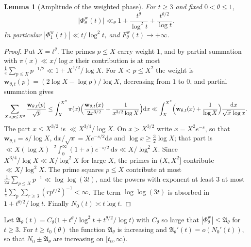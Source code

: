 \documentclass[11pt,a4paper]{article}
\numberwithin{equation}{section}
\newtheorem{lemma}[theorem]{Lemma}
\theoremstyle{definition}
\theoremstyle{remark}
\begin{document}
\begin{lemma}[Amplitude of the weighted phase]\label{lem:taucw-amp}
For $t\ge3$ and fixed $0<\theta\le1$,
\begin{equation}\label{eq:taucw-amp}
\bigl|\Phi^{\mathrm w}_\theta(t)\bigr|\ll_\theta1+\frac{t^\theta}{\log^2t}+\frac{t^{\theta/2}}{\log t}.
\end{equation}
In particular $|\Phi^{\mathrm w}_1(t)|\ll t/\log^2t$, and $F^{\mathrm w}_\theta(t)\to+\infty$.
\end{lemma}
\begin{proof}
Put $X=t^\theta$. The primes $p\le X$ carry weight $1$, and by partial summation with $\pi(x)\ll x/\log x$ their contribution is at most $\frac1\pi\sum_{p\le X}p^{-1/2}\ll1+X^{1/2}/\log X$. For $X<p\le X^2$ the weight is $\mathbf w_{\theta,t}(p)=(2\log X-\log p)/\log X$, decreasing from $1$ to $0$, and partial summation gives
\begin{equation}
\sum_{X<p\le X^2}\frac{\mathbf w_{\theta,t}(p)}{\sqrt p}\le\int_X^{X^2}\pi(x)\Bigl(\frac{\mathbf w_{\theta,t}(x)}{2x^{3/2}}+\frac{1}{x^{3/2}\log X}\Bigr)\mathrm dx
\ll\int_X^{X^2}\Bigl(\mathbf w_{\theta,t}(x)+\frac1{\log X}\Bigr)\frac{\mathrm dx}{\sqrt x\,\log x}.
\end{equation}
The part $x\le X^{3/2}$ is $\ll X^{3/4}/\log X$. On $x>X^{3/2}$ write $x=X^2e^{-s}$, so that $\mathbf w_{\theta,t}=s/\log X$, $\mathrm dx/\sqrt x=Xe^{-s/2}\mathrm ds$ and $\log x\ge\frac32\log X$; that part is $\ll X(\log X)^{-2}\int_0^\infty(1+s)e^{-s/2}\,\mathrm ds\ll X/\log^2X$. Since $X^{3/4}/\log X\ll X/\log^2X$ for large $X$, the primes in $(X,X^2]$ contribute $\ll X/\log^2X$. The prime squares $p\le X$ contribute at most $\frac1{2\pi}\sum_{p\le X}p^{-1}\ll\log\log(3t)$, and the powers with exponent at least $3$ at most $\frac1\pi\sum_p\sum_{r\ge3}(rp^{r/2})^{-1}<\infty$. The term $\log\log(3t)$ is absorbed in $1+t^{\theta/2}/\log t$. Finally $N_0(t)\asymp t\log t$.
\end{proof}

Let $\mathfrak A_\theta(t)=C_\theta\bigl(1+t^\theta/\log^2t+t^{\theta/2}/\log t\bigr)$ with $C_\theta$ so large that $|\Phi^{\mathrm w}_\theta|\le\mathfrak A_\theta$ for $t\ge3$. For $t\ge t_0(\theta)$ the function $\mathfrak A_\theta$ is increasing and $\mathfrak A_\theta'(t)=o(N_0'(t))$, so that $N_0\pm\mathfrak A_\theta$ are increasing on $[t_0,\infty)$.
\end{document}
